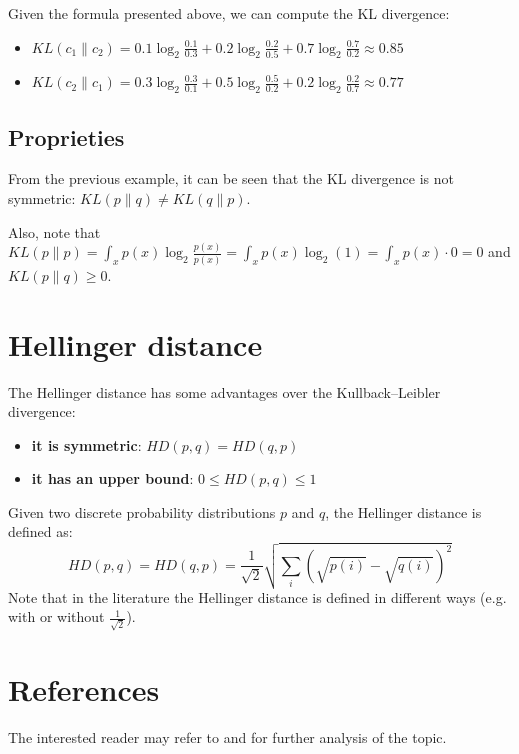 Given the formula presented above, we can compute the KL divergence:
\begin{itemize}
    \item $\mathit{KL}(c_1 \| c_2) = 0.1 \log_2 \frac{0.1}{0.3} + 0.2 \log_2 \frac{0.2}{0.5} + 0.7 \log_2 \frac{0.7}{0.2} \approx 0.85$
    \item $\mathit{KL}(c_2 \| c_1) = 0.3 \log_2 \frac{0.3}{0.1} + 0.5 \log_2 \frac{0.5}{0.2} + 0.2 \log_2 \frac{0.2}{0.7} \approx 0.77$
\end{itemize}


\subsection{Proprieties}
From the previous example, it can be seen that the KL divergence is not symmetric: $\mathit{KL}(p \| q) \neq \mathit{KL}(q \| p)$.

Also, note that $\mathit{KL}(p \| p) = \int_x p(x) \log_2 \frac{p(x)}{p(x)} = \int_x p(x) \log_2 (1) = \int_x p(x) \cdot 0 = 0$
and $\mathit{KL}(p \| q) \geq 0$.

\section{Hellinger distance} \label{hd}
The Hellinger distance has some advantages over the Kullback–Leibler divergence:
\begin{itemize}
    \item \textbf{it is symmetric}: $\mathit{HD}(p, q) = \mathit{HD}(q, p)$
    \item \textbf{it has an upper bound}: $0 \leq \mathit{HD}(p, q) \leq 1$
\end{itemize}

Given two discrete probability distributions $p$ and $q$, the Hellinger distance is defined as:
\[\mathit{HD}(p, q) = \mathit{HD}(q, p) = \frac{1}{\sqrt{2}} \sqrt{\sum_i (\sqrt{p(i)} - \sqrt{q(i)})^2}\]
Note that in the literature the Hellinger distance is defined in different ways (e.g. with or without $\frac{1}{\sqrt{2}}$).

\section{References}
The interested reader may refer to \cite{Joyce2011} and \cite{Hellinger1909} for further analysis of the topic.